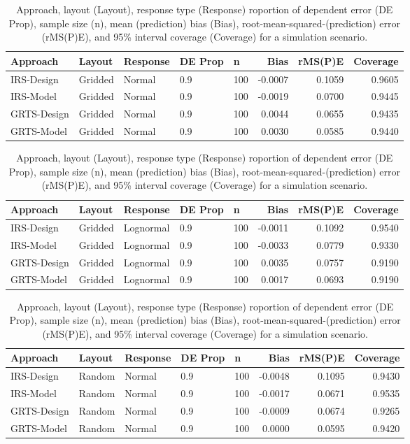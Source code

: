 \documentclass[]{elsarticle} %
\begin{document}
\begin{table}[ht]
\centering
\begin{tabular}{lllllrrr}
  \hline
Approach & Layout & Response & DE Prop & n & Bias & rMS(P)E & Coverage \\ 
  \hline
IRS-Design & Gridded & Normal & 0.9 & 100 & -0.0007 & 0.1059 & 0.9605 \\ 
  IRS-Model & Gridded & Normal & 0.9 & 100 & -0.0019 & 0.0700 & 0.9445 \\ 
  GRTS-Design & Gridded & Normal & 0.9 & 100 & 0.0044 & 0.0655 & 0.9435 \\ 
  GRTS-Model & Gridded & Normal & 0.9 & 100 & 0.0030 & 0.0585 & 0.9440 \\ 
   \hline
\end{tabular}
\caption{Approach, layout (Layout), response type (Response) roportion of dependent error (DE Prop), sample size (n), mean (prediction) bias (Bias), root-mean-squared-(prediction) error (rMS(P)E), and 95\% interval coverage (Coverage) for a simulation scenario.} 
\end{table}
\begin{table}[ht]
\centering
\begin{tabular}{lllllrrr}
  \hline
Approach & Layout & Response & DE Prop & n & Bias & rMS(P)E & Coverage \\ 
  \hline
IRS-Design & Gridded & Lognormal & 0.9 & 100 & -0.0011 & 0.1092 & 0.9540 \\ 
  IRS-Model & Gridded & Lognormal & 0.9 & 100 & -0.0033 & 0.0779 & 0.9330 \\ 
  GRTS-Design & Gridded & Lognormal & 0.9 & 100 & 0.0035 & 0.0757 & 0.9190 \\ 
  GRTS-Model & Gridded & Lognormal & 0.9 & 100 & 0.0017 & 0.0693 & 0.9190 \\ 
   \hline
\end{tabular}
\caption{Approach, layout (Layout), response type (Response) roportion of dependent error (DE Prop), sample size (n), mean (prediction) bias (Bias), root-mean-squared-(prediction) error (rMS(P)E), and 95\% interval coverage (Coverage) for a simulation scenario.} 
\end{table}
\begin{table}[ht]
\centering
\begin{tabular}{lllllrrr}
  \hline
Approach & Layout & Response & DE Prop & n & Bias & rMS(P)E & Coverage \\ 
  \hline
IRS-Design & Random & Normal & 0.9 & 100 & -0.0048 & 0.1095 & 0.9430 \\ 
  IRS-Model & Random & Normal & 0.9 & 100 & -0.0017 & 0.0671 & 0.9535 \\ 
  GRTS-Design & Random & Normal & 0.9 & 100 & -0.0009 & 0.0674 & 0.9265 \\ 
  GRTS-Model & Random & Normal & 0.9 & 100 & 0.0000 & 0.0595 & 0.9420 \\ 
   \hline
\end{tabular}
\caption{Approach, layout (Layout), response type (Response) roportion of dependent error (DE Prop), sample size (n), mean (prediction) bias (Bias), root-mean-squared-(prediction) error (rMS(P)E), and 95\% interval coverage (Coverage) for a simulation scenario.} 
\end{table}
\end{document}
